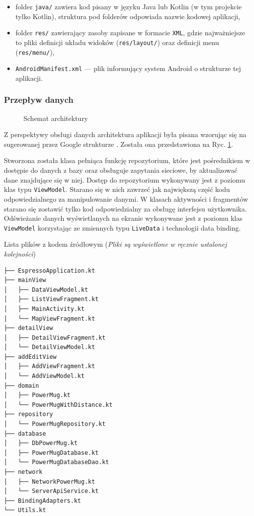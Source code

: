 \documentclass[polish,polish,a4paper,12pt]{article}
\begin{document}
		\begin{itemize}
			\item folder \texttt{java/} zawiera kod pisany w języku Java lub Kotlin (w tym projekcie tylko Kotlin), struktura pod folderów odpowiada nazwie kodowej aplikacji,
			\item folder \texttt{res/} zawierający zasoby zapisane w formacie \texttt{XML}, gdzie najważniejsze to pliki definicji układu widoków (\texttt{res/layout/}) oraz definicji menu (\texttt{res/menu/}),
			\item \texttt{AndroidManifest.xml} — plik informujący system Android o strukturze tej aplikacji.
		\end{itemize}

		\subsubsection{Przepływ danych}

		\begin{figure}[H]
			\centering
			
			\caption{Schemat architektury}
			\label{fig:architecture}
		\end{figure}

		Z perspektywy obsługi danych architektura aplikacji była pisana wzorując się na sugerowanej przez Google strukturze \cite{googlearch}\cite{kotlin}. Została ona przedstawiona na Ryc. \ref{fig:architecture}.

		Stworzona została klasa pełniąca funkcję repozytorium, które jest pośrednikiem w dostępie do danych z bazy oraz obsługuje zapytania sieciowe, by aktualizować dane znajdujące się w niej. Dostęp do repozytorium wykonywany jest z poziomu klas typu \texttt{ViewModel}. Starano się w nich zawrzeć jak największą część kodu odpowiedzialnego za manipulowanie danymi. W klasach aktywności i fragmentów starano się zostawić tylko kod odpowiedzialny za obsługę interfejsu użytkownika. Odświeżanie danych wyświetlanych na ekranie wykonywane jest z poziomu klas \texttt{ViewModel} korzystając ze zmiennych typu \texttt{LiveData} i technologii data binding.

		\begin{listing}[H]
			\caption{Lista plików z kodem źródłowym (\textit{Pliki są wyświetlone w ręcznie ustalonej kolejności})}
			\begin{verbatim}
├── EspressoApplication.kt
├── mainView
│   ├── DataViewModel.kt
│   ├── ListViewFragment.kt
│   ├── MainActivity.kt
│   └── MapViewFragment.kt
├── detailView
│   ├── DetailViewFragment.kt
│   └── DetailViewModel.kt
├── addEditView
│   ├── AddViewFragment.kt
│   └── AddViewModel.kt
├── domain
│   ├── PowerMug.kt
│   └── PowerMugWithDistance.kt
├── repository
│   └── PowerMugRepository.kt
├── database
│   ├── DbPowerMug.kt
│   ├── PowerMugDatabase.kt
│   └── PowerMugDatabaseDao.kt
├── network
│   ├── NetworkPowerMug.kt
│   └── ServerApiService.kt
├── BindingAdapters.kt
└── Utils.kt
			\end{verbatim}
			\label{listing:files}
		\end{listing}
\end{document}
